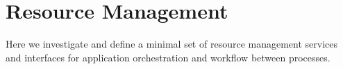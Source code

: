 
\section{Resource Management}
\label{sec:resources}

Here we investigate and define a minimal set of resource management
services and interfaces for application orchestration and workflow
between processes.
